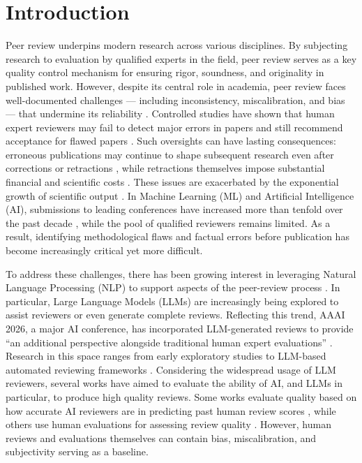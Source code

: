\documentclass{article}
\begin{document}
\section{Introduction}
Peer review underpins modern research across various disciplines. By subjecting research to evaluation by qualified experts in the field, peer review serves as a key quality control mechanism for ensuring rigor, soundness, and originality in published work. However, despite its central role in academia, peer review faces well-documented challenges --- including inconsistency, miscalibration, and bias --- that undermine its reliability \citep{shah2021}. Controlled studies have shown that human expert reviewers may fail to detect major errors in papers and still recommend acceptance for flawed papers \citep[Section 10.1]{shah2021}. Such oversights can have lasting consequences: erroneous publications may continue to shape subsequent research even after corrections or retractions \citep{shepperd2023}, while retractions themselves impose substantial financial and scientific costs \citep{stern2014}. These issues are exacerbated by the exponential growth of scientific output \citep{landhuis2016}. In Machine Learning (ML) and Artificial Intelligence (AI), submissions to leading conferences have increased more than tenfold over the past decade \citep{nip2024,iclr2025}, while the pool of qualified reviewers remains limited. As a result, identifying methodological flaws and factual errors before publication has become increasingly critical yet more difficult. 

To address these challenges, there has been growing interest in leveraging Natural Language Processing (NLP) to support aspects of the peer-review process \citep{kuznetsov2024}. In particular, Large Language Models (LLMs) are increasingly being explored to assist reviewers or even generate complete reviews. Reflecting this trend, AAAI 2026, a major AI conference, has incorporated LLM-generated reviews to provide “an additional perspective alongside traditional human expert evaluations” \citep{aaai_genai}. Research in this space ranges from early exploratory studies \citep{liu2023} to LLM-based automated reviewing frameworks \citep{yu2024, darcy2024, tyser2024, idahl2025}. Considering the widespread usage of LLM reviewers, several works have aimed to evaluate the ability of AI, and LLMs in particular, to produce high quality reviews. Some works evaluate quality based on how accurate AI reviewers are in predicting past human review scores \citep{checco2021aiassisted, tyser2024, idahl2025}, while others use human evaluations for assessing review quality \citep{liang2023usefulfeedback, darcy2024}. However, human reviews and evaluations themselves can contain bias, miscalibration, and subjectivity serving as a baseline. 
\end{document}
